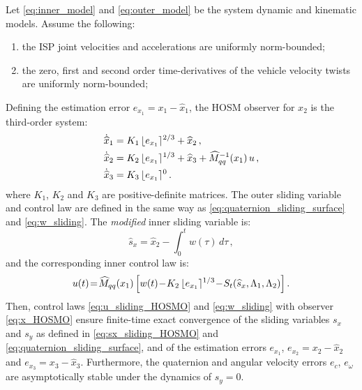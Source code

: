 \begin{theorem}

Let \eqref{eq:inner_model} and \eqref{eq:outer_model} be the system dynamic and kinematic models.
%
Assume the following:
%
\begin{enumerate}[label=(\roman*)]
%
\item the ISP joint velocities and accelerations are uniformly norm-bounded; \label{hosm_assump:1}
%
\item the zero, first and second order time-derivatives of the vehicle velocity twists are uniformly norm-bounded; \label{hosm_assump:2}
%
\end{enumerate}
%
Defining the estimation error $e_{x_1} = x_1 - \hat{x}_1$, the HOSM observer for $x_2$ is the third-order system:
%
\begin{align}
\dot{\widehat{x}}_1 &= K_1 \, \lfloor e_{x_1} \rceil^{2/3} + \widehat{x}_2 \,, \nonumber \\
\dot{\widehat{x}}_2 &= K_2 \, \lfloor e_{x_1} \rceil^{1/3} + \widehat{x}_3 + \widehat{M}^{-1}_{qq}(x_1) \, u \,, \nonumber \\
\dot{\widehat{x}}_3 &= K_3 \, \lfloor e_{x_1} \rceil^{0} \,.
\label{eq:x_HOSMO}
\end{align}
%
where $K_1$, $K_2$ and $K_3$ are positive-definite matrices.
%
The outer sliding variable and control law are defined in the same way as \eqref{eq:quaternion_sliding_surface} and \eqref{eq:w_sliding}.
%
The {\it modified} inner sliding variable is:
%
\begin{equation}
\widehat{s}_x = \widehat{x}_2 - \int^t_0{w(\tau)} \, d\tau \,,
\label{eq:sx_sliding_HOSMO}
\end{equation}
%
and the corresponding inner control law is:
%
\begin{equation}
u(t) \!=\! \widehat{M}_{qq}(x_1) \left[ w(t) \!-\! K_2 \, \lfloor e_{x_1} \rceil^{1/3} \!-\! S_t(\widehat{s}_x,\Lambda_1,\Lambda_2) \right].
\label{eq:u_sliding_HOSMO}
\end{equation}
%
Then, control laws \eqref{eq:u_sliding_HOSMO} and \eqref{eq:w_sliding} with observer \eqref{eq:x_HOSMO} ensure finite-time exact convergence of the sliding variables $s_x$ and $s_y$ as defined in \eqref{eq:sx_sliding_HOSMO} and \eqref{eq:quaternion_sliding_surface}, and of the estimation errors $e_{x_1}$, $e_{x_2} = x_2 - \widehat{x}_2$ and $e_{x_3} = x_3 - \widehat{x}_3$. Furthermore, the quaternion and angular velocity errors $e_c$, $e_\omega$ are asymptotically stable under the dynamics of $s_y = 0$.

\end{theorem}
